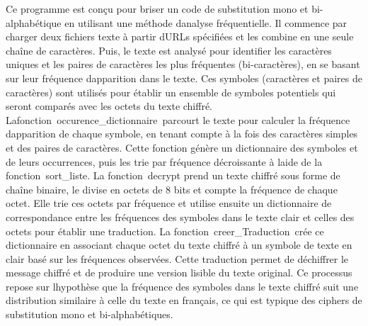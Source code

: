 \documentclass{article}
\begin{document}
Ce programme est conçu pour briser un code de substitution mono et
bi-alphabétique en utilisant une méthode d\textquotesingle analyse
fréquentielle. Il commence par charger deux fichiers texte à partir
d\textquotesingle URLs spécifiées et les combine en une seule chaîne de
caractères. Puis, le texte est analysé pour identifier les caractères
uniques et les paires de caractères les plus fréquentes (bi-caractères),
en se basant sur leur fréquence d\textquotesingle apparition dans le
texte. Ces symboles (caractères et paires de caractères) sont utilisés
pour établir un ensemble de symboles potentiels qui seront comparés avec
les octets du texte chiffré. \\
Lafonction~occurence\_dictionnaire~parcourt le texte pour calculer la
fréquence d\textquotesingle apparition de chaque symbole, en tenant
compte à la fois des caractères simples et des paires de caractères.
Cette fonction génère un dictionnaire des symboles et de leurs
occurrences, puis les trie par fréquence décroissante à
l\textquotesingle aide de la fonction~sort\_liste. La fonction~decrypt
prend un texte chiffré sous forme de chaîne binaire, le divise en octets
de 8 bits et compte la fréquence de chaque octet. Elle trie ces octets
par fréquence et utilise ensuite un dictionnaire de correspondance entre
les fréquences des symboles dans le texte clair et celles des octets
pour établir une traduction. La fonction~creer\_Traduction~crée ce
dictionnaire en associant chaque octet du texte chiffré à un symbole de
texte en clair basé sur les fréquences observées. Cette traduction
permet de déchiffrer le message chiffré et de produire une version
lisible du texte original. Ce processus repose sur
l\textquotesingle hypothèse que la fréquence des symboles dans le texte
chiffré suit une distribution similaire à celle du texte en français, ce
qui est typique des ciphers de substitution mono et bi-alphabétiques.
\end{document}
